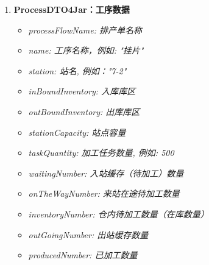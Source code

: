 \begin{enumerate}[label=\arabic*)]
		\item \bf{ProcessDTO4Jar}：工序数据\label{sec:param-process}
		\begin{itemize}
			\item \it{processFlowName}: 排产单名称
			\item \it{name}: 工序名称，例如: "挂片"
			\item \it{station}: 站名, 例如："7-2"
			\item \it{inBoundInventory}: 入库库区
			\item \it{outBoundInventory}: 出库库区
			\item \it{stationCapacity}: 站点容量
			\item \it{taskQuantity}: 加工任务数量, 例如: 500
			\item \it{waitingNumber}: 入站缓存（待加工）数量
			\item \it{onTheWayNumber}: 来站在途待加工数量
			\item \it{inventoryNumber}: 仓内待加工数量（在库数量）
			\item \it{outGoingNumber}: 出站缓存数量
			\item \it{producedNumber}: 已加工数量
		\end{itemize}
	\end{enumerate}

